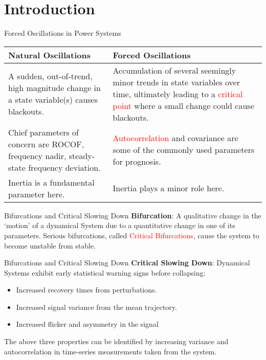 \section[Introduction]{Introduction}
\label{sec:lasso_introduction}

\begin{frame}[fragile]{Forced Oscillations in Power Systems}
	\begin{tabularx}{\textwidth}{
			@{\hspace{1.5em}}%
			>{\leavevmode\raggedright}%
			X%
			@{\quad\hspace{1.5em}}%
			>{\leavevmode\raggedright\arraybackslash}%
			X%
			@{}%
		}
		\textbf{Natural Oscillations} & \textbf{Forced Oscillations}\\
		\toprule
		A sudden, out-of-trend, high magnitude change in a state variable(s) causes blackouts. & 
		Accumulation of several seemingly minor trends in state variables over time, ultimately leading to a \textcolor{red}{critical point} where a small change could cause blackouts.\\
		Chief parameters of concern are ROCOF, frequency nadir, steady-state frequency deviation. & 
		\textcolor{red}{Autocorrelation} and covariance are some of the commonly used parameters for prognosis.\\
		Inertia is a fundamental parameter here. & Inertia plays a minor role here.\\
		\bottomrule
	\end{tabularx}
\end{frame}

\begin{frame}{Bifurcations and Critical Slowing Down}
	\textbf{Bifurcation}: A qualitative change in the `motion' of a dynamical System due to a quantitative change in one of its parameters. Serious bifurcations, called \textcolor{red}{Critical Bifurcations}, cause the system to become unstable from stable.
\end{frame}

\begin{frame}{Bifurcations and Critical Slowing Down}
	\textbf{Critical Slowing Down}: Dynamical Systems exhibit early statistical warning signs before collapsing:
	
	\begin{itemize}
		\item Increased recovery times from perturbations.
		\item Increased signal variance from the mean trajectory.
		\item Increased flicker and asymmetry in the signal
	\end{itemize}
	
	The above three properties can be identified by increasing variance and autocorrelation in time-series measurements taken from the system.
\end{frame}
